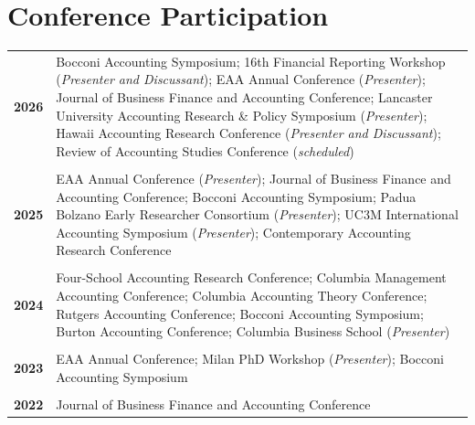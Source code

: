 \section{Conference Participation}
\vspace{1mm}
{\footnotesize
\begin{tabular*}{\textwidth}[t]{l@{\hspace{1em}}p{}}
  \textbf{2026} & Bocconi Accounting Symposium; 16th Financial Reporting Workshop (\textit{Presenter and Discussant}); EAA Annual Conference (\textit{Presenter}); Journal of Business Finance and Accounting Conference; Lancaster University Accounting Research \& Policy Symposium  (\textit{Presenter}); Hawaii Accounting Research Conference (\textit{Presenter and Discussant}); Review of Accounting Studies Conference (\textit{scheduled}) \\
  \\[-0.2ex]
  \textbf{2025} & EAA Annual Conference (\textit{Presenter}); Journal of Business Finance and Accounting Conference; Bocconi Accounting Symposium; Padua Bolzano Early Researcher Consortium (\textit{Presenter}); UC3M International Accounting Symposium (\textit{Presenter}); Contemporary Accounting Research Conference \\
  \\[-0.2ex]
  \textbf{2024} & Four-School Accounting Research Conference; Columbia Management Accounting Conference; Columbia Accounting Theory Conference; Rutgers Accounting Conference; Bocconi Accounting Symposium; Burton Accounting Conference; Columbia Business School (\textit{Presenter})\\
  \\[-0.2ex]
  \textbf{2023} & EAA Annual Conference; Milan PhD Workshop (\textit{Presenter}); Bocconi Accounting Symposium \\
  \\[-0.2ex]
  \textbf{2022} & Journal of Business Finance and Accounting Conference \\
\end{tabular*}

}
